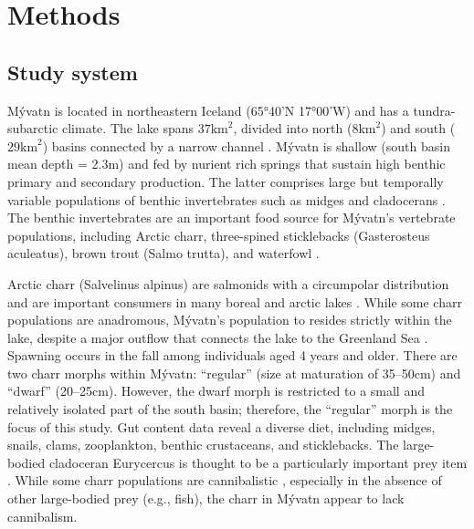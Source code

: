 \section*{Methods} 

\subsection*{Study system} 

M\'{y}vatn is located in northeastern Iceland (65°40’N 17°00’W) 
and has a tundra-subarctic climate. 
The lake spans $37 \text{km}^2$, 
divided into north ($8 \text{km}^2$) and south ($29 \text{km}^2$) basins 
connected by a narrow channel \citep{einarsson2004myvatn}. 
M\'{y}vatn is shallow (south basin mean depth = 2.3m) and 
fed by nurient rich springs that sustain high benthic primary and secondary production.
The latter comprises large but temporally variable populations of benthic invertebrates 
such as midges and cladocerans \citep{einarsson2004clad, gardarsson2004population}.
The benthic invertebrates are an important food source for M\'{y}vatn’s vertebrate populations, 
including Arctic charr, three-spined sticklebacks (Gasterosteus aculeatus), 
brown trout (Salmo trutta), and waterfowl \citep{einarsson2004myvatn}. 

Arctic charr (Salvelinus alpinus) are salmonids with a circumpolar distribution 
and are important consumers in many boreal and arctic lakes \citep{klemetsen2003atlantic}. 
While some charr populations are anadromous, 
M\'{y}vatn’s population to resides strictly within the lake, 
despite a major outflow that connects the lake to the Greenland Sea \citep{gudbergsson2004}. 
Spawning occurs in the fall among individuals aged 4 years and older. 
There are two charr morphs within M\'{y}vatn: ``regular'' (size at maturation of 35--50cm) 
and ``dwarf'' (20--25cm). However, the dwarf morph is restricted to a small 
and relatively isolated part of the south basin; therefore, 
the ``regular'' morph is the focus of this study. 
Gut content data reveal a diverse diet, including midges, snails, clams, zooplankton, 
benthic crustaceans, and sticklebacks. 
The large-bodied cladoceran Eurycercus is thought to be a particularly important prey item 
\citep{gudbergsson2004}. 
While some charr populations are cannibalistic \citep{klemetsen2003atlantic}, 
especially in the absence of other large-bodied prey (e.g., fish), 
the charr in M\'{y}vatn appear to lack cannibalism. 

